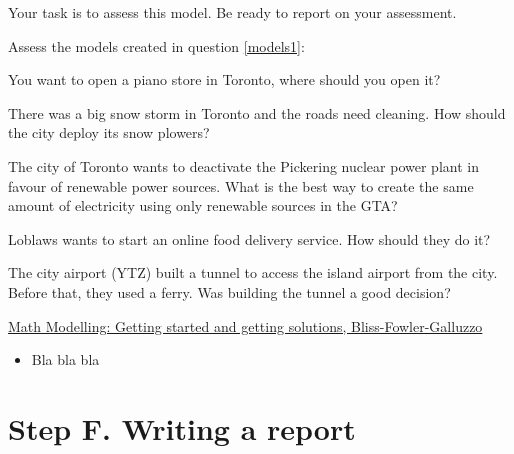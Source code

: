 Your task is to assess this model.
Be ready to report on your assessment.




\newpage

\question
Assess the models created in question \ref{models1}:

\begin{parts}
	\item You want to open a piano store in Toronto, where should you open it?
	\item There was a big snow storm in Toronto and the roads need cleaning. How should the city deploy its snow plowers?
	\item The city of Toronto wants to deactivate the Pickering nuclear power plant in favour of renewable power sources. What is the best way to create the same amount of electricity using only renewable sources in the GTA?
	\item Loblaws wants to start an online food delivery service. How should they do it?
	\item The city airport (YTZ) built a tunnel to access the island airport from the city. Before that, they used a ferry. Was building the tunnel a good decision?	
\end{parts}







\begin{module}
	 \href{https://m3challenge.siam.org/resources/modeling-handbook}{Math Modelling: Getting started and getting solutions, Bliss-Fowler-Galluzzo}
	
	\begin{itemize}
		\item Bla bla bla	
	\end{itemize}
	


\end{module}




\section*{Step F. Writing a report}\label{F-report}



